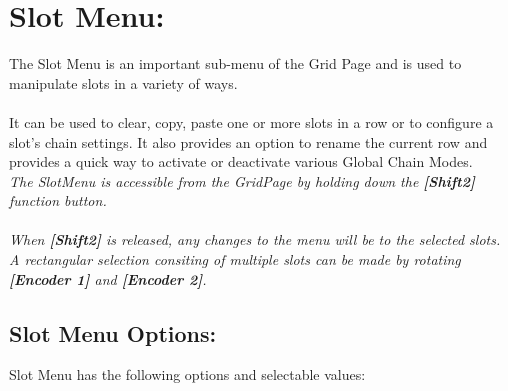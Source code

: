 \chapter{Slot Menu:}

The Slot Menu is an important sub-menu of the Grid Page and is used to manipulate slots in a variety of ways.
\\\\
It can be used to clear, copy, paste one or more slots in a row or to configure a slot's chain settings. It also provides an option to rename the current row and provides a quick way to activate or deactivate various Global Chain Modes.
\\
\textit{The SlotMenu is accessible from the GridPage by holding down the  \textbf{[Shift2]} function button.\\
\\
When \textbf{[Shift2]} is released, any changes to the menu will be to the selected slots. A rectangular selection consiting of multiple slots can be made by rotating \textbf{[Encoder 1]} and \textbf{[Encoder 2]}. }


\section{Slot Menu Options:}
Slot Menu has the following options and selectable values:

